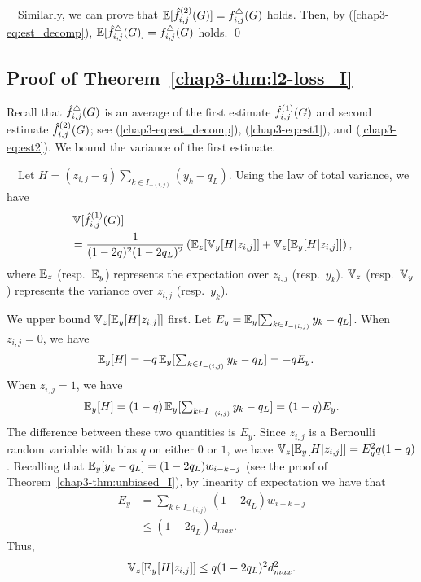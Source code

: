     \smallskip
    ~~Similarly, we can prove that $\operatorname{\mathbb{E}}[\hat{f}_{i,j}^{(2)}(G)] = f_{i,j}^\triangle(G)$ holds.
    Then, by (\ref{chap3-eq:est_decomp}), $\operatorname{\mathbb{E}}[\hat{f}_{i,j}^\triangle(G)] = f_{i,j}^\triangle(G)$ holds. \qed

\subsection{Proof of Theorem~\ref{chap3-thm:l2-loss_I}}
\label{chap3-sub:l2-loss_I_proof}

Recall that $\hat{f}_{i,j}^\triangle(G)$ is an average of the first estimate $\hat{f}_{i,j}^{(1)}(G)$ and second estimate $\hat{f}_{i,j}^{(2)}(G)$; see (\ref{chap3-eq:est_decomp}), (\ref{chap3-eq:est1}), and (\ref{chap3-eq:est2}). We bound the variance of the first estimate.

\smallskip
{}~~Let $H = (z_{i,j}-q)\sum_{k \in I_{-(i,j)}} (y_{k} - q_L)$.
Using the law of total variance, we have
\begin{align*}
    &\operatorname{\mathbb{V}}[\hat{f}_{i,j}^{(1)}(G)] \\
    &= \frac{1}{(1-2q)^2(1-2q_L)^2}\left(\operatorname{\mathbb{E}}_z[\operatorname{\mathbb{V}}_y[H | z_{i,j}]] + \operatorname{\mathbb{V}}_z[\operatorname{\mathbb{E}}_y[H | z_{i,j}]]\right),
\end{align*}
where $\operatorname{\mathbb{E}}_z$ (resp.~$\operatorname{\mathbb{E}}_y$) represents the expectation over $z_{i,j}$ (resp.~$y_{k}$).
$\operatorname{\mathbb{V}}_z$ (resp.~$\operatorname{\mathbb{V}}_y$) represents the variance over $z_{i,j}$ (resp.~$y_{k}$).

We upper bound $\operatorname{\mathbb{V}}_z[\operatorname{\mathbb{E}}_y[H | z_{i,j}]]$ first. Let $E_y = \operatorname{\mathbb{E}}_y[\sum_{k \in
I_{-(i,j)}} y_{k} \allowbreak -q_L]$. When $z_{i,j} = 0$, we have
\begin{align*}
\operatorname{\mathbb{E}}_y[H] &= -q\operatorname{\mathbb{E}}_y[\textstyle{\sum_{k \in I_{-(i,j)}} y_{k}-q_L}] = -qE_y.
\end{align*}
When $z_{i,j} = 1$, we have
\[
  \operatorname{\mathbb{E}}_y[H] = (1-q)\operatorname{\mathbb{E}}_y[\textstyle{\sum_{k \in I_{-(i,j)}} y_{k}-q_L}] = (1-q)E_y.
\]
The difference between these two quantities is $E_y$.
Since $z_{i,j}$ is a Bernoulli random variable with bias $q$ on either $0$ or
$1$, we have $\operatorname{\mathbb{V}}_z[\operatorname{\mathbb{E}}_y[H|z_{i,j}]] = E_y^2 q(1-q)$.
Recalling that $\operatorname{\mathbb{E}}_y[y_{k}-q_L] = (1-2q_L)w_{i-k-j}$ (see the proof of Theorem~\ref{chap3-thm:unbiased_I}), by linearity of expectation we have that
\begin{align*}
    E_y &= \sum_{k \in I_{-(i,j)}} (1-2q_L)w_{i-k-j} \\
    &\leq (1-2q_L) d_{max}.
\end{align*}
Thus,
\[
  \operatorname{\mathbb{V}}_z[\operatorname{\mathbb{E}}_y[H|z_{i,j}]] \leq q(1-2q_L)^2 d_{max}^2.
\]

